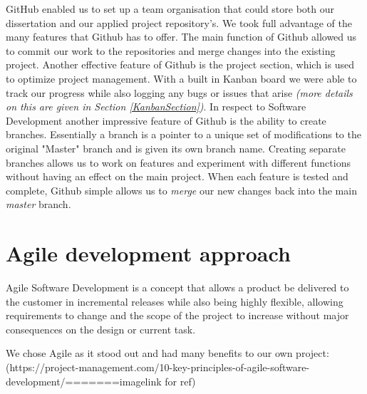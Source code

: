 GitHub enabled us to set up a team organisation that could store both our dissertation and our applied project repository's. We took full advantage of the many features that Github has to offer. The main function of Github allowed us to commit our work to the repositories and merge changes into the existing project. Another effective feature of Github is the project section, which is used to optimize project management. With a built in Kanban board we were able to track our progress while also logging any bugs or issues that arise \textit{(more details on this are given in Section \ref{KanbanSection})}. In respect to Software Development another impressive feature of Github is the ability to create branches. Essentially a branch is a pointer to a unique set of modifications to the original "Master" branch and is given its own branch name. Creating separate branches allows us to work on features and experiment with different functions without having an effect on the main project. When each feature is tested and complete, Github simple allows us to \textit{merge} our new changes back into the main \textit{master} branch.

\section{Agile development approach}
Agile Software Development is a concept that allows a product be delivered to the customer in incremental releases while also being highly flexible, allowing requirements to change and the scope of the project to increase without major consequences on the design or current task\cite{agile}.

We chose Agile as it stood out and had many benefits to our own project:
(https://project-management.com/10-key-principles-of-agile-software-development/=======imagelink for ref)

